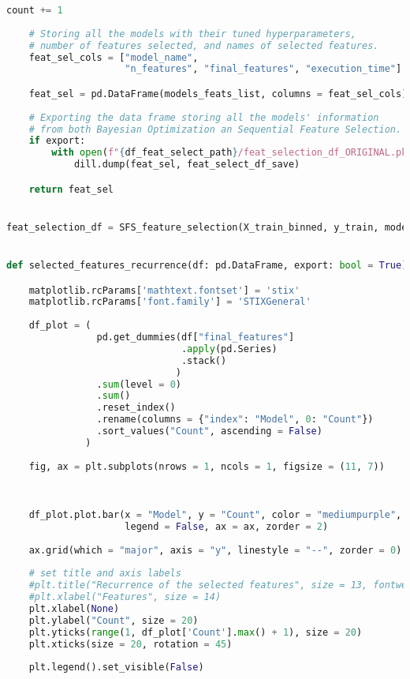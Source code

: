 \begin{lstlisting}[language=Python, basicstyle=\footnotesize\ttfamily]
        count += 1
        
    # Storing all the models with their tuned hyperparameters,
    # number of features selected, and names of selected features.
    feat_sel_cols = ["model_name",
                     "n_features", "final_features", "execution_time"]

    feat_sel = pd.DataFrame(models_feats_list, columns = feat_sel_cols)
    
    # Exporting the data frame storing all the models' information
    # from both Bayesian Optimization an Sequential Feature Selection.
    if export:
        with open(f"{df_feat_select_path}/feat_selection_df_ORIGINAL.pkl", "wb") as feat_select_df_save:
            dill.dump(feat_sel, feat_select_df_save)

    return feat_sel


feat_selection_df = SFS_feature_selection(X_train_binned, y_train, models_dict, seed)


def selected_features_recurrence(df: pd.DataFrame, export: bool = True):

    matplotlib.rcParams['mathtext.fontset'] = 'stix'
    matplotlib.rcParams['font.family'] = 'STIXGeneral'
    
    df_plot = (
                pd.get_dummies(df["final_features"]
                               .apply(pd.Series)
                               .stack()
                              )
                .sum(level = 0)
                .sum()
                .reset_index()
                .rename(columns = {"index": "Model", 0: "Count"})
                .sort_values("Count", ascending = False)
              )
    
    fig, ax = plt.subplots(nrows = 1, ncols = 1, figsize = (11, 7))

    
    
    df_plot.plot.bar(x = "Model", y = "Count", color = "mediumpurple",
                     legend = False, ax = ax, zorder = 2)
    
    ax.grid(which = "major", axis = "y", linestyle = "--", zorder = 0)
    
    # set title and axis labels
    #plt.title("Recurrence of the selected features", size = 13, fontweight = "bold")
    #plt.xlabel("Features", size = 14)
    plt.xlabel(None)
    plt.ylabel("Count", size = 20)
    plt.yticks(range(1, df_plot['Count'].max() + 1), size = 20)
    plt.xticks(size = 20, rotation = 45)
    
    plt.legend().set_visible(False)
    

\end{lstlisting}
